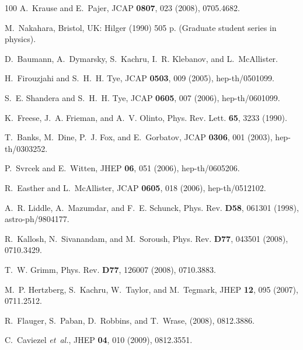 \documentclass[12pt,letterpaper,rotate]{article}
\begin{document}
{\begin{thebibliography}{100}
A.~Krause and E.~Pajer,
\newblock JCAP {\bf 0807}, 023 (2008), 0705.4682.

M.~Nakahara,
\newblock Bristol, UK: Hilger (1990) 505 p. (Graduate student series in
  physics).

D.~Baumann, A.~Dymarsky, S.~Kachru, I.~R. Klebanov, and L.~McAllister.

H.~Firouzjahi and S.~H.~H. Tye,
\newblock JCAP {\bf 0503}, 009 (2005), hep-th/0501099.

S.~E. Shandera and S.~H.~H. Tye,
\newblock JCAP {\bf 0605}, 007 (2006), hep-th/0601099.

K.~Freese, J.~A. Frieman, and A.~V. Olinto,
\newblock Phys. Rev. Lett. {\bf 65}, 3233 (1990).

T.~Banks, M.~Dine, P.~J. Fox, and E.~Gorbatov,
\newblock JCAP {\bf 0306}, 001 (2003), hep-th/0303252.

P.~Svrcek and E.~Witten,
\newblock JHEP {\bf 06}, 051 (2006), hep-th/0605206.

R.~Easther and L.~McAllister,
\newblock JCAP {\bf 0605}, 018 (2006), hep-th/0512102.

A.~R. Liddle, A.~Mazumdar, and F.~E. Schunck,
\newblock Phys. Rev. {\bf D58}, 061301 (1998), astro-ph/9804177.

R.~Kallosh, N.~Sivanandam, and M.~Soroush,
\newblock Phys. Rev. {\bf D77}, 043501 (2008), 0710.3429.

T.~W. Grimm,
\newblock Phys. Rev. {\bf D77}, 126007 (2008), 0710.3883.

M.~P. Hertzberg, S.~Kachru, W.~Taylor, and M.~Tegmark,
\newblock JHEP {\bf 12}, 095 (2007), 0711.2512.

R.~Flauger, S.~Paban, D.~Robbins, and T.~Wrase,
\newblock (2008), 0812.3886.

C.~Caviezel {\em et~al.},
\newblock JHEP {\bf 04}, 010 (2009), 0812.3551.


\end{thebibliography}}
\end{document}
